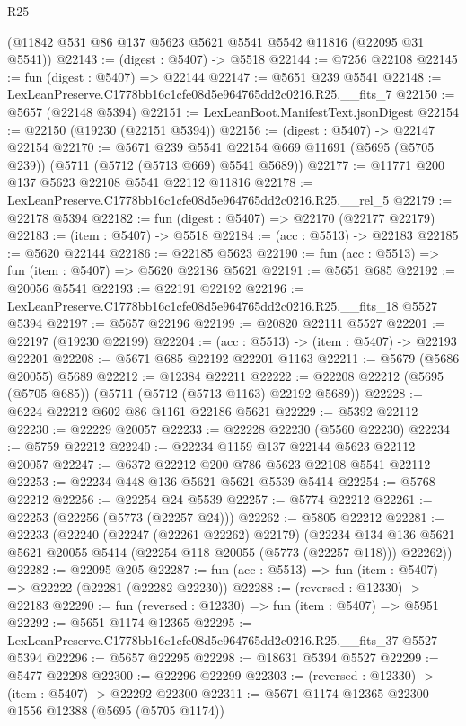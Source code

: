 \begin{lexlean}{R25}
\begin{coremodule}
    (@11842 @531 @86 @137 @5623 @5621 @5541 @5542 @11816 (@22095 @31 @5541))
@22143 := (digest : @5407) -> @5518
@22144 := @7256 @22108
@22145 := fun (digest : @5407) => @22144
@22147 := @5651 @239 @5541
@22148 := LexLeanPreserve.C1778bb16c1cfe08d5e964765dd2c0216.R25.__fits_7
@22150 := @5657 (@22148 @5394)
@22151 := LexLeanBoot.ManifestText.jsonDigest
@22154 := @22150 (@19230 (@22151 @5394))
@22156 := (digest : @5407) -> @22147 @22154
@22170 := @5671
    @239
    @5541
    @22154
    @669
    @11691
    (@5695 (@5705 @239))
    (@5711 (@5712 (@5713 @669) @5541 @5689))
@22177 := @11771 @200 @137 @5623 @22108 @5541 @22112 @11816
@22178 := LexLeanPreserve.C1778bb16c1cfe08d5e964765dd2c0216.R25.__rel_5
@22179 := @22178 @5394
@22182 := fun (digest : @5407) => @22170 (@22177 @22179)
@22183 := (item : @5407) -> @5518
@22184 := (acc : @5513) -> @22183
@22185 := @5620 @22144
@22186 := @22185 @5623
@22190 := fun (acc : @5513) => fun (item : @5407) => @5620 @22186 @5621
@22191 := @5651 @685
@22192 := @20056 @5541
@22193 := @22191 @22192
@22196 := LexLeanPreserve.C1778bb16c1cfe08d5e964765dd2c0216.R25.__fits_18 @5527 @5394
@22197 := @5657 @22196
@22199 := @20820 @22111 @5527
@22201 := @22197 (@19230 @22199)
@22204 := (acc : @5513) -> (item : @5407) -> @22193 @22201
@22208 := @5671 @685 @22192 @22201 @1163
@22211 := @5679 (@5686 @20055) @5689
@22212 := @12384 @22211
@22222 := @22208 @22212 (@5695 (@5705 @685)) (@5711 (@5712 (@5713 @1163) @22192 @5689))
@22228 := @6224 @22212 @602 @86 @1161 @22186 @5621
@22229 := @5392 @22112
@22230 := @22229 @20057
@22233 := @22228 @22230 (@5560 @22230)
@22234 := @5759 @22212
@22240 := @22234 @1159 @137 @22144 @5623 @22112 @20057
@22247 := @6372 @22212 @200 @786 @5623 @22108 @5541 @22112
@22253 := @22234 @448 @136 @5621 @5621 @5539 @5414
@22254 := @5768 @22212
@22256 := @22254 @24 @5539
@22257 := @5774 @22212
@22261 := @22253 (@22256 (@5773 (@22257 @24)))
@22262 := @5805 @22212
@22281 := @22233
    (@22240
      (@22247 (@22261 @22262) @22179)
      (@22234 @134 @136 @5621 @5621 @20055 @5414 (@22254 @118 @20055 (@5773 (@22257 @118))) @22262))
@22282 := @22095 @205
@22287 := fun (acc : @5513) => fun (item : @5407) => @22222 (@22281 (@22282 @22230))
@22288 := (reversed : @12330) -> @22183
@22290 := fun (reversed : @12330) => fun (item : @5407) => @5951
@22292 := @5651 @1174 @12365
@22295 := LexLeanPreserve.C1778bb16c1cfe08d5e964765dd2c0216.R25.__fits_37 @5527 @5394
@22296 := @5657 @22295
@22298 := @18631 @5394 @5527
@22299 := @5477 @22298
@22300 := @22296 @22299
@22303 := (reversed : @12330) -> (item : @5407) -> @22292 @22300
@22311 := @5671 @1174 @12365 @22300 @1556 @12388 (@5695 (@5705 @1174))

\end{coremodule}
\end{lexlean}
